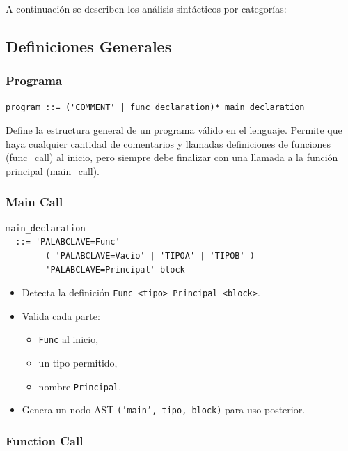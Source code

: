 \documentclass{article}
\begin{document}
A continuación se describen los análisis sintácticos por categorías:

\subsection{Definiciones Generales}

\subsubsection*{Programa}

\begin{verbatim}
program ::= ('COMMENT' | func_declaration)* main_declaration
\end{verbatim}

Define la estructura general de un programa válido en el lenguaje. 
Permite que haya cualquier cantidad de comentarios y llamadas
definiciones de funciones (func\_call) al inicio, 
pero siempre debe finalizar con una llamada a la función principal 
(main\_call).

\subsubsection*{Main Call}

\begin{verbatim}
main_declaration
  ::= 'PALABCLAVE=Func' 
        ( 'PALABCLAVE=Vacio' | 'TIPOA' | 'TIPOB' ) 
        'PALABCLAVE=Principal' block
\end{verbatim}

\begin{itemize}
    \item Detecta la definición \texttt{Func <tipo> Principal <block>}.
    \item Valida cada parte:
    \begin{itemize}
        \item \texttt{Func} al inicio,
        \item un tipo permitido,
        \item nombre \texttt{Principal}.
    \end{itemize}
    \item Genera un nodo AST \texttt{('main', tipo, block)} para uso 
      posterior.
\end{itemize}

\subsubsection*{Function Call}
\end{document}
